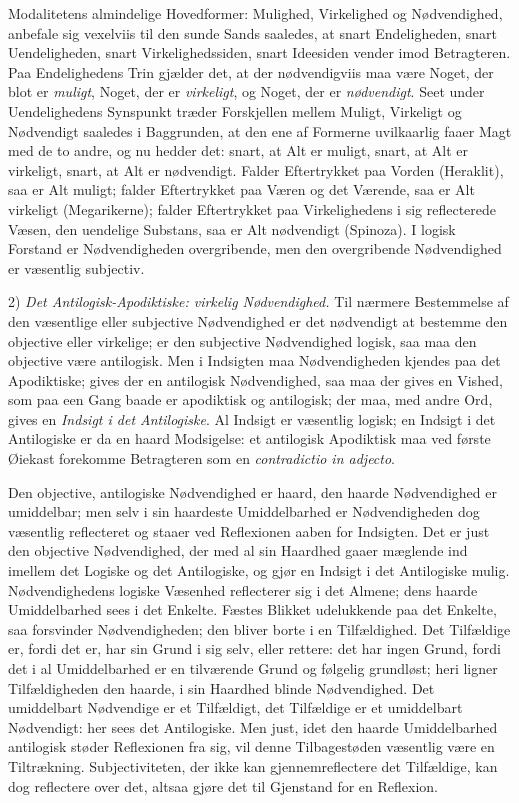 \documentclass[12pt]{book}
\newcommand{\opage}[1]{\marginnote{\footnotesize\textit{[#1]}}}
\begin{document}
Modalitetens almindelige Hovedformer: Mulighed, Virkelighed og Nødvendighed, anbefale sig vexelviis til den sunde Sands saaledes, at snart Endeligheden, snart Uendeligheden, snart Virkelighedssiden, snart Ideesiden vender imod Betragteren. Paa Endelighedens Trin gjælder det, at der nødvendigviis maa være Noget, der blot er \emph{muligt}, Noget, der er \emph{virkeligt}, og Noget, der er \emph{nødvendigt}. Seet under Uendelighedens Synspunkt træder Forskjellen mellem Muligt, Virkeligt og Nødvendigt saaledes i Baggrunden, at den ene
\opage{264}af Formerne uvilkaarlig faaer Magt med de to andre, og nu hedder det: snart, at Alt er muligt, snart, at Alt er virkeligt, snart, at Alt er nødvendigt. Falder Eftertrykket paa Vorden (Heraklit), saa er Alt muligt; falder Eftertrykket paa Væren og det Værende, saa er Alt virkeligt (Megarikerne); falder Eftertrykket paa Virkelighedens i sig reflecterede Væsen, den uendelige Substans, saa er Alt nødvendigt (Spinoza). I logisk Forstand er Nødvendigheden overgribende, men den overgribende Nødvendighed er væsentlig subjectiv.

2) \emph{Det Antilogisk-Apodiktiske: virkelig Nødvendighed.} Til nærmere Bestemmelse af den væsentlige eller subjective Nødvendighed er det nødvendigt at bestemme den objective eller virkelige; er den subjective Nødvendighed logisk, saa maa den objective være antilogisk. Men i Indsigten maa Nødvendigheden kjendes paa det Apodiktiske; gives der en antilogisk Nødvendighed, saa maa der gives en Vished, som paa een Gang baade er apodiktisk og antilogisk; der maa, med andre Ord, gives en \emph{Indsigt i det Antilogiske}. Al Indsigt er væsentlig logisk; en Indsigt i det Antilogiske er da en haard Modsigelse: et antilogisk Apodiktisk maa ved første Øiekast forekomme Betragteren som en \textit{contradictio in adjecto}.

Den objective, antilogiske Nødvendighed er haard, den haarde Nødvendighed er umiddelbar; men selv i sin haardeste Umiddelbarhed er Nødvendigheden dog væsentlig reflecteret og staaer ved Reflexionen aaben for Indsigten. Det er just den objective Nødvendighed, der med al sin Haardhed gaaer mæglende ind imellem det Logiske og det Antilogiske, og gjør en Indsigt i det Antilogiske mulig. Nødvendighedens logiske Væsenhed reflecterer sig i det Almene; dens haarde Umiddelbarhed sees i det Enkelte. Fæstes Blikket udelukkende paa det Enkelte, saa forsvinder Nødvendigheden; den bliver borte i en Tilfældighed. Det Tilfældige er, fordi det er, har sin Grund i sig selv, eller rettere: det har ingen Grund, fordi det i al Umiddelbarhed er en tilværende Grund og følgelig grundløst;
\opage{265}heri ligner Tilfældigheden den haarde, i sin Haardhed blinde Nødvendighed. Det umiddelbart Nødvendige er et Tilfældigt, det Tilfældige er et umiddelbart Nødvendigt: her sees det Antilogiske. Men just, idet den haarde Umiddelbarhed antilogisk støder Reflexionen fra sig, vil denne Tilbagestøden væsentlig være en Tiltrækning. Subjectiviteten, der ikke kan gjennemreflectere det Tilfældige, kan dog reflectere over det, altsaa gjøre det til Gjenstand for en Reflexion.
\end{document}
